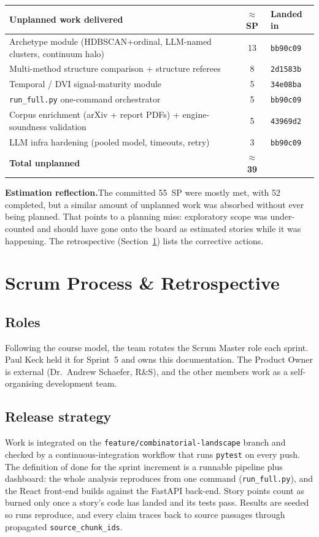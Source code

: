 \documentclass[11pt,a4paper]{article}
\newcommand{\note}[2]{\par\smallskip\noindent\textbf{#1.}\enspace #2\par\smallskip}
\newcommand{\key}[2]{\note{#1}{#2}}
\newcommand{\code}[1]{\texttt{\small #1}}
\begin{document}
\begin{center}\small
\begin{tabular}{@{}lc l@{}}
\toprule
\textbf{Unplanned work delivered} & \textbf{$\approx$SP} & \textbf{Landed in} \\
\midrule
Archetype module (HDBSCAN+ordinal, LLM-named clusters, continuum halo) & 13 & \code{bb90c09} \\
Multi-method structure comparison + structure referees & 8 & \code{2d1583b} \\
Temporal / DVI signal-maturity module & 5 & \code{34e08ba} \\
\code{run\_full.py} one-command orchestrator & 5 & \code{bb90c09} \\
Corpus enrichment (arXiv + report PDFs) + engine-soundness validation & 5 & \code{43969d2} \\
LLM infra hardening (pooled model, timeouts, retry) & 3 & \code{bb90c09} \\
\midrule
\textbf{Total unplanned} & \textbf{$\approx$39} & \\
\bottomrule
\end{tabular}
\end{center}

\key{Estimation reflection}{The committed 55~SP were mostly met, with 52 completed, but a similar amount of
unplanned work was absorbed without ever being planned. That points to a planning miss: exploratory scope
was under-counted and should have gone onto the board as estimated stories while it was happening. The
retrospective (Section~\ref{sec:process}) lists the corrective actions.}

\section{Scrum Process \& Retrospective}\label{sec:process}
\subsection*{Roles}
Following the course model, the team rotates the Scrum Master role each sprint. Paul Keck held it for
Sprint~5 and owns this documentation. The Product Owner is external (Dr.\ Andrew Schaefer, R\&S), and the
other members work as a self-organising development team.

\subsection*{Release strategy}
Work is integrated on the \code{feature/combinatorial-landscape} branch and checked by a
continuous-integration workflow that runs \code{pytest} on every push. The definition of done for the
sprint increment is a runnable pipeline plus dashboard: the whole analysis reproduces from one command
(\code{run\_full.py}), and the React front-end builds against the FastAPI back-end. Story points count as
burned only once a story's code has landed and its tests pass. Results are seeded so runs reproduce, and
every claim traces back to source passages through propagated \code{source\_chunk\_ids}.
\end{document}
